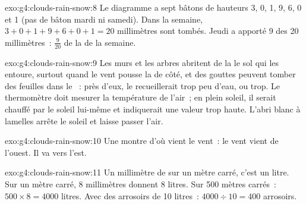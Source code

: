 \begin{solution}{exo:g4:clouds-rain-snow:8}
Le diagramme a sept bâtons de hauteurs 3, 0, 1, 9, 6, 0 et 1 (pas de bâton
mardi ni samedi). Dans la semaine, $3 + 0 + 1 + 9 + 6 + 0 + 1 = 20$
millimètres sont tombés. Jeudi a apporté 9 des 20 millimètres~:
$\frac{9}{20}$ de la  de la semaine.
\end{solution}

\begin{solution}{exo:g4:clouds-rain-snow:9}
Les murs et les arbres abritent de la  le sol qui les entoure, surtout
quand le vent pousse la  de côté, et des gouttes peuvent tomber des
feuilles dans le ~: près d'eux, le  recueillerait
trop peu d'eau, ou trop. Le thermomètre doit mesurer la température de
l'air~; en plein soleil, il serait chauffé par le soleil lui-même et
indiquerait une valeur trop haute. L'abri blanc à lamelles arrête le
soleil et laisse passer l'air.
\end{solution}

\begin{solution}{exo:g4:clouds-rain-snow:10}
Une  montre d'où vient le vent~: le vent vient de l'ouest. Il va
vers l'est.
\end{solution}

\begin{solution}{exo:g4:clouds-rain-snow:11}
Un millimètre de  sur un mètre carré, c'est un litre. Sur un mètre
carré, 8 millimètres donnent 8 litres. Sur 500 mètres carrés~:
$500 \times 8 = 4000$ litres. Avec des arrosoirs de 10 litres~:
$4000 \div 10 = 400$ arrosoirs.
\end{solution}
